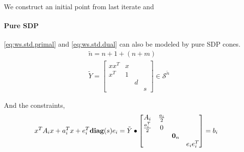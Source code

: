 \documentclass[../main]{subfiles}
\begin{document}
We construct an initial point from last iterate and

\paragraph{Pure SDP}
\eqref{eq:ws.std.primal} and \eqref{eq:ws.std.dual} can also be modeled by pure SDP cones.
\begin{equation}
    \begin{aligned}
         & \tilde n = n + 1 + (n + m)                                       \\
         & \tilde{Y} = \begin{bmatrix}
            xx^T & x &   &   \\
            x^T  & 1 &   &   \\
                 &   & d &   \\
                 &   &   & s
        \end{bmatrix}\in \mathscr S^{\tilde{n}}
    \end{aligned}
\end{equation}

And the constraints,
\begin{equation}
    x^TA_ix + a_i^Tx + e_i^T\mathbf{diag}(s)e_i = \tilde{Y} \bullet    \begin{bmatrix}
        A_i             & \frac{a_i}{2} &         &          \\
        \frac{a_i^T}{2} & 0             &         &          \\
                        &               & \bm 0_n &          \\
                        &               &         & e_ie_i^T
    \end{bmatrix} = b_i
\end{equation}
\end{document}
